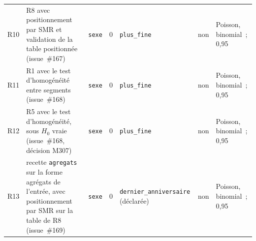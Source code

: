 \documentclass[a4paper,11pt]{article}
\newcommand{\code}[1]{\texttt{\small #1}}
\begin{document}
{\begin{longtable}{@{}p{0.6cm}p{2.8cm}p{1.4cm}p{0.9cm}p{3.2cm}p{1.2cm}p{2.6cm}@{}}
R10 & R8 avec positionnement par SMR et validation de la table positionnée (issue~\#167) & \code{sexe} & 0 & \code{plus\_fine} & non & Poisson, binomial~; 0,95 \\
R11 & R1 avec le test d'homogénéité entre segments (issue~\#168) & \code{sexe} & 0 & \code{plus\_fine} & non & Poisson, binomial~; 0,95 \\
R12 & R5 avec le test d'homogénéité, sous $H_0$ vraie (issue~\#168, décision M307) & \code{sexe} & 0 & \code{plus\_fine} & non & Poisson, binomial~; 0,95 \\
R13 & recette \code{agregats} sur la forme agrégats de l'entrée, avec positionnement par SMR sur la table de R8 (issue~\#169) & \code{sexe} & 0 & \code{dernier\_}\allowbreak\code{anniversaire} (déclarée) & non & Poisson, binomial~; 0,95 \\
\end{longtable}
}
\end{document}
